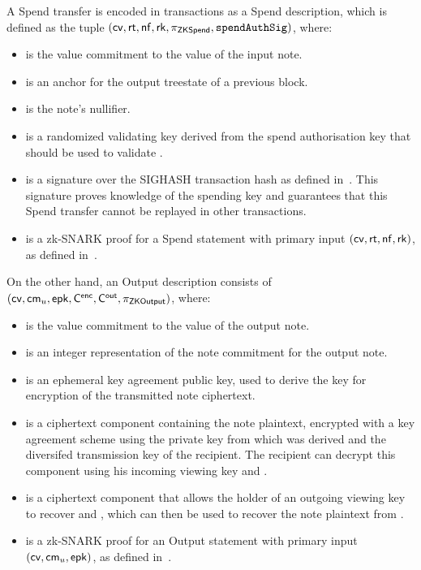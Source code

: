 A Spend transfer is encoded in transactions as a Spend description, which is defined as the tuple $(\mathsf{cv}, \mathsf{rt}, \mathsf{nf}, \mathsf{rk}, \pi_{\mathsf{ZKSpend}}, \mathtt{spendAuthSig})$, where:
\begin{itemize}
    \item \cv is the value commitment to the value of the input note.
    \item \rt is an anchor for the output treestate of a previous block.
    \item \nf is the note's nullifier.
    \item \rk is a randomized validating key derived from the spend authorisation key that should be used to validate \sas.
    \item \sas is a signature over the SIGHASH transaction hash as defined in~\cite{ZIP243}.
    This signature proves knowledge of the spending key and guarantees that this Spend transfer cannot be replayed in other transactions.
    \item \pis is a zk-SNARK proof for a Spend statement with primary input $(\mathsf{cv}, \mathsf{rt}, \mathsf{nf}, \mathsf{rk})$, as defined in~\cite[Section 4.15.2]{hopwood2016zcash}.
\end{itemize}

On the other hand, an Output description consists of $(\mathsf{cv}, \mathsf{cm_{\mathnormal{u}}}, \mathsf{epk}, \mathsf{C^{enc}}, \mathsf{C^{out}},\allowbreak \pi_{\mathsf{ZKOutput}})$, where:
\begin{itemize}
    \item \cv is the value commitment to the value of the output note.
    \item \cmu is an integer representation of the note commitment for the output note.
    \item \epk is an ephemeral key agreement public key, used to derive the key for encryption of the transmitted note ciphertext.
   \item \cenc is a ciphertext component containing the note plaintext, encrypted with a key agreement scheme using the private key \esk from which \epk was derived and the diversifed transmission key \pkd of the recipient.
   The recipient can decrypt this component using his incoming viewing key \ivk and \epk.
   \item \cout is a ciphertext component that allows the holder of an outgoing viewing key to recover \esk and \pkd, which can then be used to recover the note plaintext from \cenc.
   \item \pio is a zk-SNARK proof for an Output statement with primary input $(\mathsf{cv}, \mathsf{cm_{\mathnormal{u}}}, \mathsf{epk})$, as defined in~\cite[Section 4.15.3]{hopwood2016zcash}.
\end{itemize}

